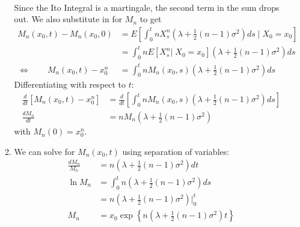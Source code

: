 \documentclass[12pt]{article}
\theoremstyle{plain}
\theoremstyle{definition}
\theoremstyle{remark}
\begin{document}
\begin{enumerate}
\begin{enumerate}
\begin{align*}
        \end{align*}
        Since the Ito Integral is a martingale, the second term in the
        sum drops out. We also substitute in for $M_n$ to get
        \begin{align*}
          M_n(x_0,t) - M_n(x_0,0)
          &= E\left[ \int^t_0 nX_s^{n}\left(
            \lambda + \frac{1}{2}(n-1) \sigma^2
            \right) ds\;\big| \;X_0=x_0\right]\\
          &= \int^t_0 n
            E\left[X_s^{n}| \;X_0=x_0\right]
            \left(
            \lambda + \frac{1}{2}(n-1) \sigma^2
            \right) ds\\
          \Leftrightarrow \qquad
          M_n(x_0,t) - x_0^n
          &= \int^t_0 n
            M_n(x_0,s)
            \left(
            \lambda + \frac{1}{2}(n-1) \sigma^2
            \right) ds
        \end{align*}
        Differentiating with respect to $t$:
        \begin{align*}
          \frac{d}{dt}\left[
          M_n(x_0,t) - x_0^n
          \right]
          &=
          \frac{d}{dt}\left[
          \int^t_0 n
            M_n(x_0,s)
            \left(
            \lambda + \frac{1}{2}(n-1) \sigma^2
            \right) ds
          \right]\\
          \frac{dM_n}{dt}
          &=
            nM_n
            \left( \lambda + \frac{1}{2}(n-1) \sigma^2 \right)
        \end{align*}
        with $M_n(0) = x_0^n$.

      \item %
        We can solve for $M_n(x_0,t)$ using separation of variables:
        \begin{align*}
          \frac{dM_n}{M_n}
          &= n \left( \lambda + \frac{1}{2}(n-1) \sigma^2 \right) dt\\
          \ln M_n
          &=
          \int_0^t
          n \left( \lambda + \frac{1}{2}(n-1) \sigma^2 \right) ds\\
          &=
          n \left( \lambda + \frac{1}{2}(n-1) \sigma^2 \right) |_0^t\\
          M_n
          &=
          x_0\exp\left\{
            n \left( \lambda + \frac{1}{2}(n-1) \sigma^2 \right)t
          \right\}
        \end{align*}


\end{enumerate}
\end{enumerate}
\end{document}
